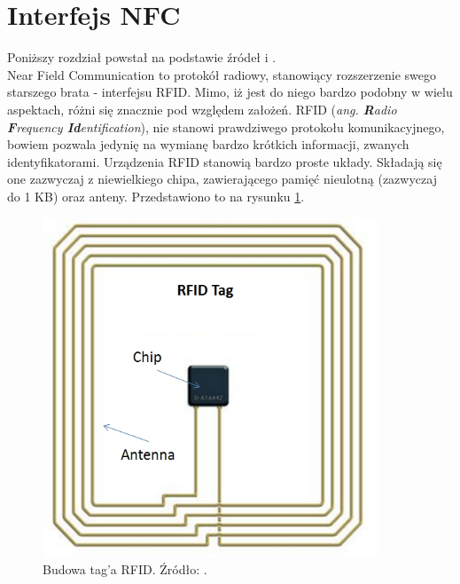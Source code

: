 \section{Interfejs NFC}
\label{NFC}

Poniższy rozdział powstał na podstawie źródeł \cite{NFC} i \cite{NFC_NXP}.\\

Near Field Communication to protokół radiowy, stanowiący rozszerzenie swego starszego brata - interfejsu RFID. Mimo, iż jest do niego bardzo podobny w wielu aspektach, różni się znacznie pod względem założeń. RFID (\textit{ang. \textbf{R}adio \textbf{F}requency \textbf{Id}entification}), nie stanowi prawdziwego protokołu komunikacyjnego, bowiem pozwala jedynię na wymianę bardzo krótkich informacji, zwanych identyfikatorami. Urządzenia RFID stanowią bardzo proste układy. Składają się one zazwyczaj z niewielkiego chipa, zawierającego pamięć nieulotną (zazwyczaj do 1 KB) oraz anteny. Przedstawiono to na rysunku \ref{fig:image_rfid_tag}.

\begin{figure}[H]
	\centering
	\includegraphics[width=10cm]{img/theory/NFC/RFID_tag.jpg}
	\caption{Budowa tag'a RFID. Źródło: \cite{RFID_antenna}.}
	\label{fig:image_rfid_tag}
\end{figure}

